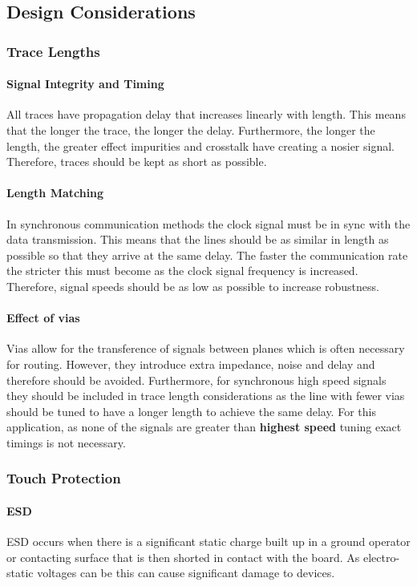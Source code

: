 \subsection{Design Considerations}

\subsubsection{Trace Lengths}
\paragraph{Signal Integrity and Timing}
All traces have propagation delay that increases linearly with length. This means that the longer the trace, the longer the delay. Furthermore, the longer the length, the greater effect impurities and crosstalk have creating a nosier signal. Therefore, traces should be kept as short as possible.
\paragraph{Length Matching}
In synchronous communication methods the clock signal must be in sync with the data transmission. This means that the lines should be as similar in length as possible so that they arrive at the same delay. The faster the communication rate the stricter this must become as the clock signal frequency is increased. Therefore, signal speeds should be as low as possible to increase robustness.
\paragraph{Effect of vias}
Vias allow for the transference of signals between planes which is often necessary for routing. However, they introduce extra impedance, noise and delay \cite{source} and therefore should be avoided. Furthermore, for synchronous high speed signals they should be included in trace length considerations as the line with fewer vias should be tuned to have a longer length to achieve the same delay. For this application, as none of the signals are greater than \textbf{highest speed} tuning exact timings is not necessary.

\subsubsection{Touch Protection}
\paragraph{\gls{ESD}}
\gls{ESD} occurs when there is a significant static charge built up in a ground operator or contacting surface that is then shorted in contact with the board. As electro-static voltages can be \cite{REF} this can cause significant damage to devices.
